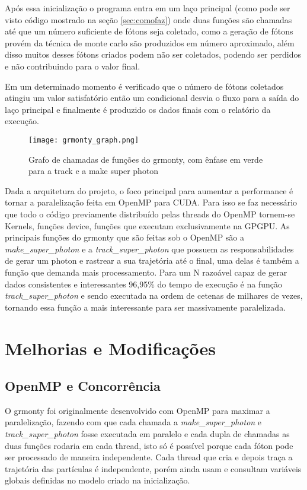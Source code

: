   Após essa inicialização o programa entra em um laço principal (como pode ser visto código mostrado na seção \ref{sec:comofaz}) onde duas funções são chamadas até que um número suficiente de fótons seja coletado, como a geração de fótons provém da técnica de monte carlo são produzidos em número aproximado, além disso muitos desses fótons criados podem não ser coletados, podendo ser perdidos e não contribuindo para o valor final.

  Em um determinado momento é verificado que o número de fótons coletados atingiu um valor satisfatório então um condicional desvia o fluxo para a saída do laço principal e finalmente é produzido os dados finais com o relatório da execução.

  \begin{figure}[!h]
    \centering
    \texttt{[image: grmonty\_graph.png]}
    \caption{Grafo de chamadas de funções do grmonty, com ênfase em verde para a track e a make super photon}
    \label{fig:grmontyGraph}
  \end{figure}


  Dada a arquitetura do projeto, o foco principal para aumentar a performance é tornar a paralelização feita em OpenMP para CUDA. Para isso se faz necessário que todo o código previamente distribuído pelas threads do OpenMP tornem-se Kernels, funções device, funções que executam exclusivamente na GPGPU. As principais funções do grmonty que são feitas sob o OpenMP são a \textit{make\_super\_photon} e a \textit{track\_super\_photon} que possuem as responsabilidades de gerar um photon e rastrear a sua trajetória até o final, uma delas é também a função que demanda mais processamento. Para um N razoável capaz de gerar dados consistentes e interessantes 96,95\% do tempo de execução é na função \textit{track\_super\_photon} e sendo executada na ordem de cetenas de milhares de vezes, tornando essa função a mais interessante para ser massivamente paralelizada.

\section{Melhorias e Modificações}
  \subsection{OpenMP e Concorrência}
    O grmonty foi originalmente desenvolvido com OpenMP para maximar a paralelização, fazendo com que cada chamada a \textit{make\_super\_photon} e \textit{track\_super\_photon} fosse executada em paralelo e cada dupla de chamadas as duas funções rodaria em cada thread, isto só é possível porque cada fóton pode ser processado de maneira independente. Cada thread que cria e depois traça a trajetória das partículas é independente, porém ainda usam e consultam variáveis globais definidas no modelo criado na inicialização.

